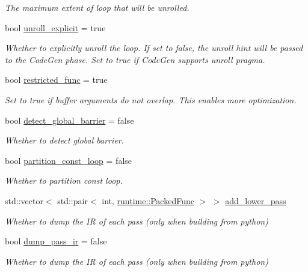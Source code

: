 \begin{DoxyCompactItemize}
\begin{DoxyCompactList}\small\item\em The maximum extent of loop that will be unrolled. \end{DoxyCompactList}\item 
bool \hyperlink{classtvm_1_1BuildConfigNode_ab0e01cf0180f09e0e3f3184cc1c01228}{unroll\+\_\+explicit} = true
\begin{DoxyCompactList}\small\item\em Whether to explicitly unroll the loop. If set to false, the unroll hint will be passed to the Code\+Gen phase. Set to true if Code\+Gen supports unroll pragma. \end{DoxyCompactList}\item 
bool \hyperlink{classtvm_1_1BuildConfigNode_a12ea43d3ae7856db884409e74f4451b6}{restricted\+\_\+func} = true
\begin{DoxyCompactList}\small\item\em Set to true if buffer arguments do not overlap. This enables more optimization. \end{DoxyCompactList}\item 
bool \hyperlink{classtvm_1_1BuildConfigNode_ae3f6cb045e5b3d85bdd39224444cb94d}{detect\+\_\+global\+\_\+barrier} = false
\begin{DoxyCompactList}\small\item\em Whether to detect global barrier. \end{DoxyCompactList}\item 
bool \hyperlink{classtvm_1_1BuildConfigNode_a1ace63c2704b6bd7cb11b41775ed9697}{partition\+\_\+const\+\_\+loop} = false
\begin{DoxyCompactList}\small\item\em Whether to partition const loop. \end{DoxyCompactList}\item 
std\+::vector$<$ std\+::pair$<$ int, \hyperlink{classtvm_1_1runtime_1_1PackedFunc}{runtime\+::\+Packed\+Func} $>$ $>$ \hyperlink{classtvm_1_1BuildConfigNode_a766fcbcd64c2f2183c423e42f1bffb7f}{add\+\_\+lower\+\_\+pass}
\begin{DoxyCompactList}\small\item\em Whether to dump the IR of each pass (only when building from python) \end{DoxyCompactList}\item 
bool \hyperlink{classtvm_1_1BuildConfigNode_a63ece2a7d9dd4ffdfc2116ed9eee12a3}{dump\+\_\+pass\+\_\+ir} = false
\begin{DoxyCompactList}\small\item\em Whether to dump the IR of each pass (only when building from python) \end{DoxyCompactList}\item 

\end{DoxyCompactItemize}
